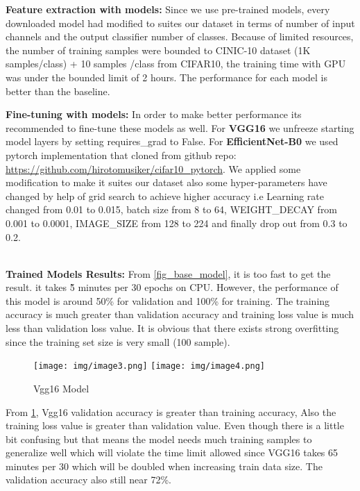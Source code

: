 \documentclass[10pt,twocolumn,letterpaper]{article}
\begin{document}
\textbf{Feature extraction with models:}
Since we use pre-trained models, every downloaded model had modified to suites our dataset in terms of number of input channels and the output classifier number of classes. Because of limited resources, the number of training samples were bounded to CINIC-10 dataset (1K samples/class) + 10 samples /class from CIFAR10, the training time with GPU was under the bounded limit of 2 hours. The performance for each model is better than the baseline.

\textbf{Fine-tuning with models:}
In order to make better performance its recommended to fine-tune these models as well. For \textbf{VGG16} we unfreeze starting model layers by setting requires\_grad to False. For \textbf{EfficientNet-B0} we used pytorch implementation that 
cloned from github repo: 
\url{https://github.com/hirotomusiker/cifar10\_pytorch}. We applied some modification to make it suites our dataset also some hyper-parameters have changed by help of grid search to achieve higher accuracy i.e Learning rate changed from 0.01 to 0.015, batch size from 8 to 64, WEIGHT\_DECAY from 0.001 to 0.0001, IMAGE\_SIZE from 128 to 224 and finally drop out from 0.3 to 0.2.

\\\textbf{Trained Models Results:}
From \ref{fig_base_model}, it is too fast to get the result. it takes \~5 minutes per 30 epochs on CPU. However, the performance of this model is around 50\% for validation and 100\% for training. The training accuracy is much greater than validation accuracy and training loss value is much less than validation loss value. It is obvious that there exists strong overfitting since the training set size is very small (100 sample). 

\begin{figure}[h]

\centering
\texttt{[image: img/image3.png]}
\texttt{[image: img/image4.png]}
\caption{Vgg16 Model\label{fig_vgg16}}
\end{figure}

From \ref{fig_vgg16}, Vgg16 validation accuracy is greater than training accuracy, Also the training loss value is greater than validation value. Even though there is a little bit confusing but that means the model needs much training samples to generalize well which will violate the time limit allowed since VGG16 takes 65 minutes per 30 which will be doubled when increasing train data size. The validation accuracy also still near 72\%.
\end{document}
